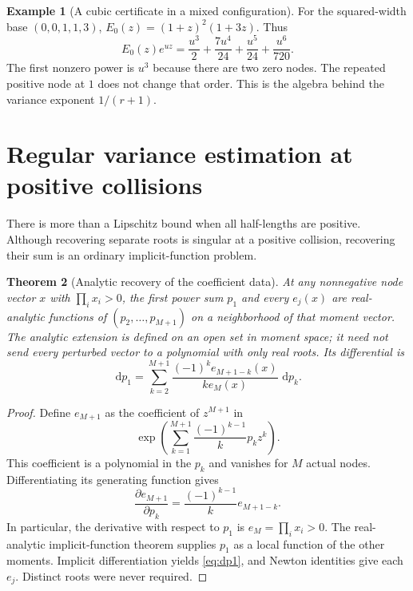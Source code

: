 \documentclass[11pt,a4paper]{article}
\numberwithin{equation}{section}
\newtheorem{theorem}{Theorem}[section]
\theoremstyle{definition}
\newtheorem{example}[theorem]{Example}
\theoremstyle{remark}
\newcommand{\dd}{\,\mathrm d}
\begin{document}
\begin{example}[A cubic certificate in a mixed configuration]
For the squared-width base $(0,0,1,1,3)$,
$E_0(z)=(1+z)^2(1+3z)$. Thus
\begin{equation}
 [z^6]E_0(z)e^{uz}
 =\frac{u^3}{2}+\frac{7u^4}{24}+\frac{u^5}{24}+\frac{u^6}{720}.
 \label{eq:cubiccertificate}
\end{equation}
The first nonzero power is $u^3$ because there are two zero nodes. The repeated
positive node at $1$ does not change that order. This is the algebra behind
the variance exponent $1/(r+1)$.
\end{example}

\section{Regular variance estimation at positive collisions}
\label{sec:normal}

There is more than a Lipschitz bound when all half-lengths are positive.
Although recovering separate roots is singular at a positive collision,
recovering their sum is an ordinary implicit-function problem.

\begin{theorem}[Analytic recovery of the coefficient data]
\label{thm:analytic}
At any nonnegative node vector $x$ with $\prod_i x_i>0$, the first power sum
$p_1$ and every $e_j(x)$ are real-analytic functions of
$(p_2,\ldots,p_{M+1})$ on a neighborhood of that moment vector. The analytic
extension is defined on an open set in moment space; it need not send every
perturbed vector to a polynomial with only real roots. Its differential is
\begin{equation}
 \dd p_1=\sum_{k=2}^{M+1}
       \frac{(-1)^k e_{M+1-k}(x)}{k e_M(x)}\,\dd p_k.
 \label{eq:dp1}
\end{equation}
\end{theorem}
\begin{proof}
Define $e_{M+1}$ as the coefficient of $z^{M+1}$ in
\begin{equation}
 \exp\left(\sum_{k=1}^{M+1}\frac{(-1)^{k-1}}{k}p_k z^k\right).
\end{equation}
This coefficient is a polynomial in the $p_k$ and vanishes for $M$ actual
nodes. Differentiating its generating function gives
\begin{equation}
 \frac{\partial e_{M+1}}{\partial p_k}
   =\frac{(-1)^{k-1}}{k}e_{M+1-k}.
\end{equation}
In particular, the derivative with respect to $p_1$ is $e_M=\prod_i x_i>0$.
The real-analytic implicit-function theorem supplies $p_1$ as a local function
of the other moments. Implicit differentiation yields \eqref{eq:dp1}, and
Newton identities give each $e_j$. Distinct roots were never required.
\end{proof}
\end{document}
